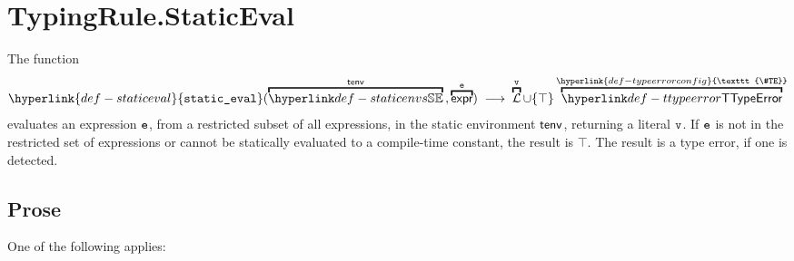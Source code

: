 \documentclass{book}
\newcommand\TypeErrorConfig[0]{\hyperlink{def-typeerrorconfig}{\texttt{\#TE}}}
\newcommand\staticeval[0]{\hyperlink{def-staticeval}{\texttt{static\_eval}}}
\newcommand\UnsupportedExpression[0]{\top}
\begin{document}
\hypertarget{def-staticeval}{}
\section{TypingRule.StaticEval \label{sec:TypingRule.StaticEval}}
The function
\[
  \staticeval(\overname{\staticenvs}{\tenv} \aslsep \overname{\expr}{\ve}) \;\aslto\;
  \overname{\literals}{\vv} \cup
  \{\UnsupportedExpression\}
  \overname{\TTypeError}{\TypeErrorConfig}
\]
evaluates an expression $\texttt{e}$, from a restricted subset of all expressions,
in the static environment $\textsf{tenv}$, returning a literal $\texttt{v}$.
If $\texttt{e}$ is not in the restricted set of expressions or cannot be statically evaluated to a compile-time
constant, the result is $\UnsupportedExpression$.
The result is a type error, if one is detected.

\subsection{Prose}
One of the following applies:
\end{document}
